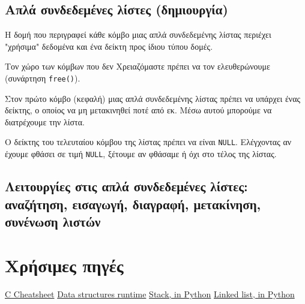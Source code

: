 \documentclass[14pt, fleqn, leqno]{extreport}
\begin{document}
\section{Απλά συνδεδεμένες λίστες (δημιουργία)}

Η δομή που περιγραφεί κάθε κόμβο μιας απλά συνδεδεμένης λίστας περιέχει "χρήσιμα" δεδομένα και ένα δείκτη προς ίδιου τύπου δομές.

Τον χώρο των κόμβων που δεν Χρειαζόμαστε πρέπει να τον ελευθερώνουμε (συνάρτηση \lstinline{free()}).

Στον πρώτο κόμβο (κεφαλή) μιας απλά συνδεδεμένης λίστας πρέπει να υπάρχει ένας δείκτης, ο οποίος να μη μετακινηθεί ποτέ από εκ. Μέσω αυτού μπορούμε να διατρέχουμε την λίστα.

Ο δείκτης του τελευταίου κόμβου της λίστας πρέπει να είναι \lstinline{NULL}. Ελέγχοντας αν έχουμε φθάσει σε τιμή \lstinline{NULL}, ξέτουμε αν φθάσαμε ή όχι στο τέλος της λίστας.

\section{Λειτουργίες στις απλά συνδεδεμένες λίστες: αναζήτηση, εισαγωγή, διαγραφή, μετακίνηση, συνένωση λιστών}

\chapter{Χρήσιμες πηγές}

\href{https://courses.cs.washington.edu/courses/cse351/16wi/sections/1/Cheatsheet-c.pdf}{C Cheatsheet}
\href{https://medium.com/@stephen_gou/data-structures-and-algorithms-cheat-sheet-b06c7ff5515f}{Data structures runtime}
\href{https://www.interviewcake.com/concept/python/stack?}{Stack, in Python}
\href{https://www.interviewcake.com/concept/python/linked-list?}{Linked list, in Python}
\end{document}
